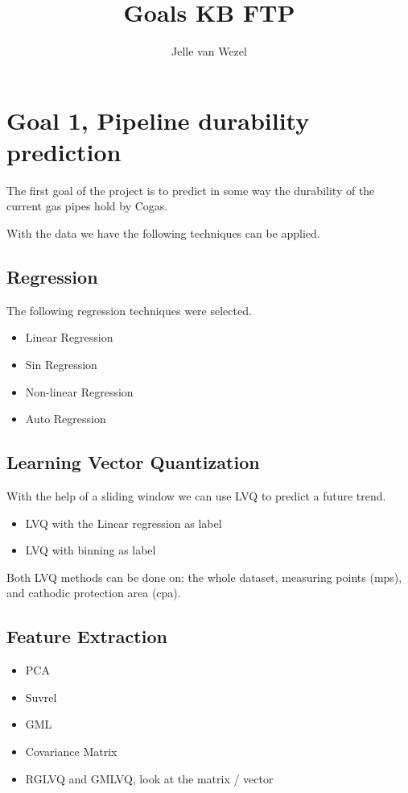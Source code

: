 \documentclass{article}
\begin{document}
\title{Goals KB FTP}
\author{Jelle van Wezel}

\maketitle

\section{Goal 1, Pipeline durability prediction}

The first goal of the project is to predict in some way the durability of the current gas pipes hold by Cogas.

With the data we have the following techniques can be applied.

\subsection{Regression}

The following regression techniques were selected.

\begin{itemize}
\item Linear Regression
\item Sin Regression
\item Non-linear Regression
\item Auto Regression
\end{itemize}

\subsection{Learning Vector Quantization}

With the help of a sliding window we can use LVQ to predict a future trend.

\begin{itemize}
\item LVQ with the Linear regression as label
\item LVQ with binning as label
\end{itemize}

Both LVQ methods can be done on: the whole dataset, measuring points (mps), and cathodic protection area (cpa).

\subsection{Feature Extraction}

\begin{itemize}
\item PCA
\item Suvrel
\item GML
\item Covariance Matrix
\item RGLVQ and GMLVQ, look at the matrix / vector
\end{itemize}
\end{document}
